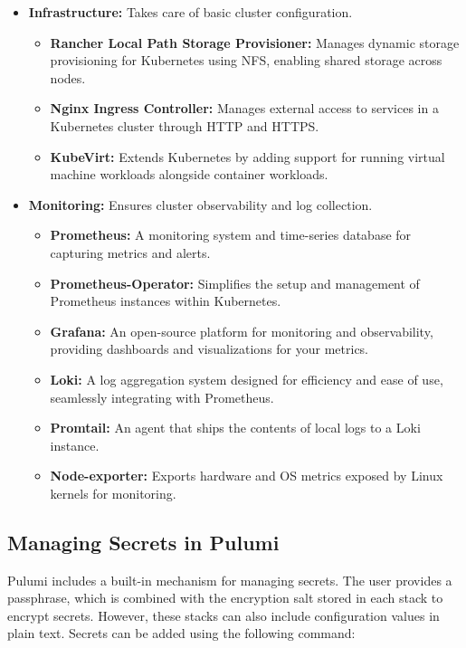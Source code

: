 \begin{itemize}
\begin{itemize}
    \end{itemize}
    \item \textbf{Infrastructure:} Takes care of basic cluster configuration.
    \begin{itemize}
        \item \textbf{Rancher Local Path Storage Provisioner:} Manages dynamic storage provisioning for Kubernetes using NFS, enabling shared storage across nodes.
        \item \textbf{Nginx Ingress Controller:} Manages external access to services in a Kubernetes cluster through HTTP and HTTPS.
        \item \textbf{KubeVirt:} Extends Kubernetes by adding support for running virtual machine workloads alongside container workloads.
    \end{itemize}
    \item \textbf{Monitoring:} Ensures cluster observability and log collection.
    \begin{itemize}
        \item \textbf{Prometheus:} A monitoring system and time-series database for capturing metrics and alerts.
        \item \textbf{Prometheus-Operator:} Simplifies the setup and management of Prometheus instances within Kubernetes.
        \item \textbf{Grafana:} An open-source platform for monitoring and observability, providing dashboards and visualizations for your metrics.
        \item \textbf{Loki:} A log aggregation system designed for efficiency and ease of use, seamlessly integrating with Prometheus.
        \item \textbf{Promtail:} An agent that ships the contents of local logs to a Loki instance.
        \item \textbf{Node-exporter:} Exports hardware and OS metrics exposed by Linux kernels for monitoring.
    \end{itemize}
\end{itemize}

\subsection{Managing Secrets in Pulumi}
Pulumi includes a built-in mechanism for managing secrets. The user provides a passphrase, which is combined with the encryption salt stored in each stack to encrypt secrets. However, these stacks can also include configuration values in plain text. Secrets can be added using the following command:

